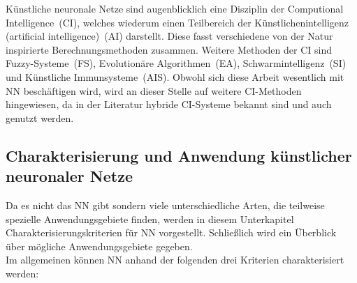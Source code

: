 Künstliche neuronale Netze sind augenblicklich eine Disziplin der Computional Intelligence~(CI), welches wiederum einen Teilbereich der Künstlichenintelligenz (artificial intelligence)~(AI) darstellt. Diese fasst verschiedene von der Natur inspirierte Berechnungsmethoden zusammen. Weitere Methoden der CI sind Fuzzy-Systeme~(FS), Evolutionäre Algorithmen~(EA), Schwarmintelligenz~(SI) und Künstliche Immunsysteme~(AIS). Obwohl sich diese Arbeit wesentlich mit NN beschäftigen wird, wird an dieser Stelle auf weitere CI-Methoden hingewiesen, da in der Literatur hybride CI-Systeme bekannt sind und auch genutzt werden.

\subsection{Charakterisierung und Anwendung künstlicher neuronaler Netze}

Da es nicht das NN gibt sondern viele unterschiedliche Arten, die teilweise spezielle Anwendungsgebiete finden, werden in diesem Unterkapitel Charakterisierungskriterien für NN vorgestellt. Schließlich wird ein Überblick über mögliche Anwendungsgebiete gegeben.\\

Im allgemeinen können NN anhand der folgenden drei Kriterien charakterisiert werden:%

